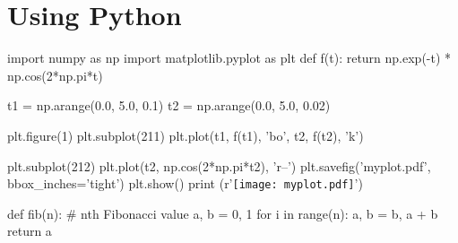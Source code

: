 \documentclass[12pt, letterpaper, twoside]{article}
\begin{document}
\section{Using Python}

\begin{pycode}

import numpy as np
import matplotlib.pyplot as plt
def f(t):
    return np.exp(-t) * np.cos(2*np.pi*t)

t1 = np.arange(0.0, 5.0, 0.1)
t2 = np.arange(0.0, 5.0, 0.02)

plt.figure(1)
plt.subplot(211)
plt.plot(t1, f(t1), 'bo', t2, f(t2), 'k')

plt.subplot(212)
plt.plot(t2, np.cos(2*np.pi*t2), 'r--')
plt.savefig('myplot.pdf', bbox_inches='tight')
plt.show()
print (r'\texttt{[image: myplot.pdf]}')

\end{pycode}

\begin{pycode}
def fib(n): # nth Fibonacci value
     a, b = 0, 1
     for i in range(n):
         a, b = b, a + b
     return a
\end{pycode}
\end{document}
